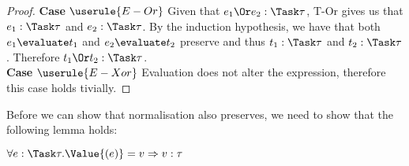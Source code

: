 \begin{proof}
  \noindent\textbf{Case} $\userule{E-Or}$
      Given that $e_1\Or e_2:\Task\tau$, T-Or gives us that $e_1:\Task\tau$ and
      $e_2:\Task\tau$. By the induction hypothesis, we have that both
      $e_1\evaluate t_1$ and $e_2\evaluate t_2$ preserve and thus $t_1:\Task\tau$
      and $t_2:\Task\tau$. Therefore $t_1\Or t_2:\Task\tau$.\\

  \noindent\textbf{Case} $\userule{E-Xor}$
      Evaluation does not alter the expression, therefore this case holds tivially.
\end{proof}

Before we can show that normalisation also preserves, we need to show that the following lemma holds:\\

\begin{lemma}
  $\forall e:\Task\tau . \Value{(e)}=v \implies v:\tau$
  \label{lemmavaluepreserves}
\end{lemma}
